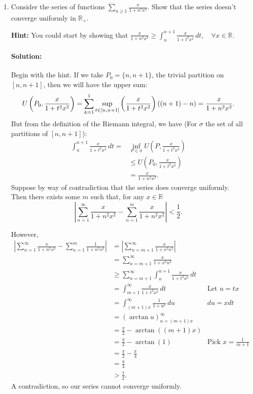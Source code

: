 \documentclass{article}
\begin{document}
\begin{enumerate}
\begin{enumerate}
  \end{enumerate}
  \newpage
\item Consider the series of functions $\sum_{n\geq 1}^{} \frac{x}{1+n^2x^2}$. Show that the series doesn't converge uniformly in $\mathbb{R}_+$.

  \textbf{Hint:} You could start by showing that $\frac{x}{1+n^2x^2}\geq \int_{n}^{n+1} \frac{x}{1+t^2x^2} \, d t, \quad \forall x\in \mathbb{R}$.

  \paragraph{Solution: }Begin with the hint. If we take $P_{0}=\{n,n+1\} $, the trivial partition on $[n,n+1]$, then we will have the upper sum:
  \[
       U\left(P_0,\frac{x}{1+t^2x^2}\right)=\sum_{k=1}^{1} \sup_{t\in [n,n+1]}\left( \frac{x}{1+t^2x^2} \right) ((n+1)-n)\\
       = \frac{x}{1+n^2x^2} \\
  .\] 
  But from the definition of the Riemann integral, we have (For $\sigma$ the set of all partitions of $[n,n+1]$):
  \begin{align*}
      \int_{n}^{n+1} \frac{x}{1+t^2x^2} \, d t=&\inf_{P\in \sigma}U\left(P,\frac{x}{1+t^2x^2}\right)\\
                        &\leq U\left( P_0,\frac{x}{1+t^2x^2} \right) \\
      &= \frac{x}{1+n^2x^2}
  .\end{align*}
  Suppose by way of contradiction that the series does converge uniformly. Then there exists some $m$ such that, for any $x\in \mathbb{R}$
  \[
  \left| \sum_{n=1}^{\infty} \frac{x}{1+n^2x^2}-\sum_{n=1}^{m} \frac{x}{1+n^2x^2} \right| <\frac{1}{2}
  .\] 

  However,
  \begin{align*}
      \left| \sum_{n=1}^{\infty} \frac{x}{1+n^2x^2}-\sum_{n=1}^{m} \frac{1}{1+n^2x^2} \right| &= \left| \sum_{n=m+1}^{\infty} \frac{x}{1+x^2n^2} \right|  \\
                  &=\sum_{n=m+1}^{\infty} \frac{x}{1+x^2n^2}\\
                  &\geq \sum_{n=m+1}^{\infty} \int_{n}^{n+1} \frac{x}{1+t^2x^2} \, d t \\
                    &= \int_{m+1}^{\infty} \frac{x}{1+t^2x^2} \, d t &\text{Let }u=tx \\
                    &= \int_{(m+1)x}^{\infty} \frac{1}{1+u^2} \, d u &du=xdt \\
                    &= \left( \arctan u \right)_{u=(m+1)x}^{\infty} \\
                    &= \frac{\pi}{2}-\arctan ((m+1)x)\\
                    &= \frac{\pi}{2}-\arctan(1) &\text{Pick }x=\frac{1}{m+1} \\
                    &= \frac{\pi}{2}-\frac{\pi}{4} \\
                    &= \frac{\pi}{4}\\
                    & >\frac{1}{2}
  .\end{align*}
A contradiction, so our series cannot converge uniformly.
\end{enumerate}
\end{document}
